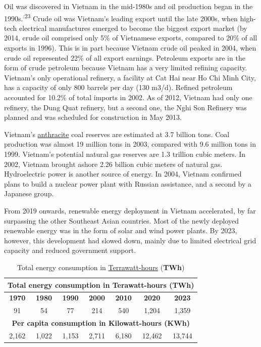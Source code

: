 \documentclass[openany]{book}
\begin{document}
Oil was discovered in Vietnam in the mid-1980s and oil production began in the 1990s.\cite{43}\textsuperscript{:23} Crude oil was Vietnam's leading export until the late 2000s, when high-tech electrical manufactures emerged to become the biggest export market (by 2014, crude oil comprised only 5\% of Vietnamese exports, compared to 20\% of all exports in 1996). This is in part because Vietnam crude oil peaked in 2004, when crude oil represented 22\% of all export earnings.\cite{75} Petroleum exports are in the form of crude petroleum because Vietnam has a very limited refining capacity. Vietnam's only operational refinery, a facility at Cat Hai near Ho Chi Minh City, has a capacity of only 800 barrels per day (130 m3/d). Refined petroleum accounted for 10.2\% of total imports in 2002. As of 2012, Vietnam had only one refinery, the Dung Quat refinery, but a second one, the Nghi Son Refinery was planned and was scheduled for construction in May 2013.\cite{36}\cite{76}

Vietnam's \href{https://en.wikipedia.org/wiki/Anthracite}{anthracite} coal reserves are estimated at 3.7 billion tons. Coal production was almost 19 million tons in 2003, compared with 9.6 million tons in 1999. Vietnam's potential natural gas reserves are 1.3 trillion cubic meters. In 2002, Vietnam brought ashore 2.26 billion cubic meters of natural gas. Hydroelectric power is another source of energy. In 2004, Vietnam confirmed plans to build a nuclear power plant with Russian assistance,\cite{36} and a second by a Japanese group.

From 2019 onwards, renewable energy deployment in Vietnam accelerated, by far surpassing the other Southeast Asian countries.\cite{77} Most of the newly deployed renewable energy was in the form of solar and wind power plants. By 2023, however, this development had slowed down, mainly due to limited electrical grid capacity and reduced government support.\cite{77}
\clearpage
\begin{table}[h!]
    \centering
    \caption*{Total energy consumption in \href{https://en.wikipedia.org/wiki/Terrawatt-hour}{Terrawatt-hours} (\textbf{TWh})}
    \label{tab:energy_consumption}
    \begin{tabular}{|c|c|c|c|c|c|c|}
    \hline
    \multicolumn{7}{|c|}{\textbf{Total energy consumption in Terawatt-hours (TWh)}} \\
    \hline
    \cellcolor{white}\textbf{1970} & \textbf{1980} & \textbf{1990} & \textbf{2000} & \textbf{2010} & \textbf{2020} & \textbf{2023} \\
    \hline
    91 & 54 & 77 & 214 & 540 & 1,204 & 1,359 \\
    \hline
    \multicolumn{7}{|c|}{\textbf{Per capita consumption in Kilowatt-hours (KWh)}} \\
    \hline
    2,162 & 1,022 & 1,153 & 2,711 & 6,180 & 12,462 & 13,744 \\
    \hline
    \end{tabular}
\end{table}
\end{document}
